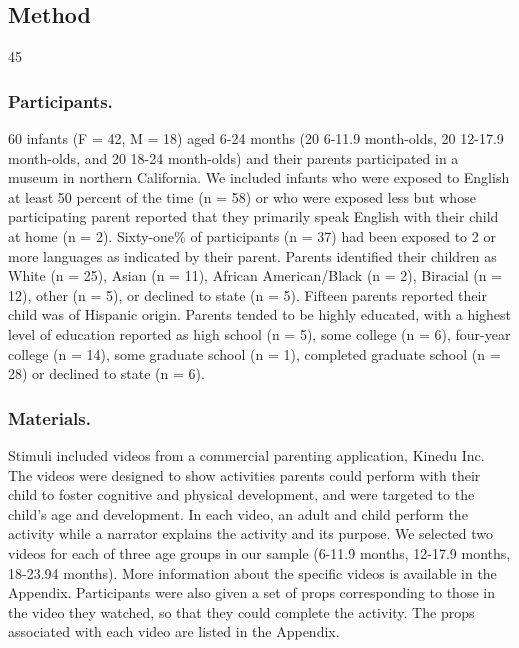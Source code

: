 \documentclass[10pt, letterpaper]{article}
\newenvironment{CodeChunk}{}{}
\begin{document}
\subsection{Method}\label{method}

\begin{CodeChunk}
\begin{CodeOutput}
[1] 45
\end{CodeOutput}
\end{CodeChunk}

\subsubsection{Participants.}\label{participants.}

60 infants (F = 42, M = 18) aged 6-24 months (20 6-11.9 month-olds, 20
12-17.9 month-olds, and 20 18-24 month-olds) and their parents
participated in a museum in northern California. We included infants who
were exposed to English at least 50 percent of the time (n = 58) or who
were exposed less but whose participating parent reported that they
primarily speak English with their child at home (n = 2). Sixty-one\% of
participants (n = 37) had been exposed to 2 or more languages as
indicated by their parent. Parents identified their children as White (n
= 25), Asian (n = 11), African American/Black (n = 2), Biracial (n =
12), other (n = 5), or declined to state (n = 5). Fifteen parents
reported their child was of Hispanic origin. Parents tended to be highly
educated, with a highest level of education reported as high school (n =
5), some college (n = 6), four-year college (n = 14), some graduate
school (n = 1), completed graduate school (n = 28) or declined to state
(n = 6).

\subsubsection{Materials.}\label{materials.}

Stimuli included videos from a commercial parenting application, Kinedu
Inc. The videos were designed to show activities parents could perform
with their child to foster cognitive and physical development, and were
targeted to the child's age and development. In each video, an adult and
child perform the activity while a narrator explains the activity and
its purpose. We selected two videos for each of three age groups in our
sample (6-11.9 months, 12-17.9 months, 18-23.94 months). More
information about the specific videos is available in the Appendix.
Participants were also given a set of props corresponding to those in
the video they watched, so that they could complete the activity. The
props associated with each video are listed in the Appendix.
\end{document}
